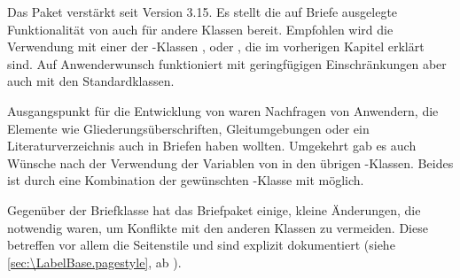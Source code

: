 \iffalse%
Die Klasse \Class{scrlttr2}\important{\Class{scrlttr2}} wurde 2002 von Grund
auf neu entwickelt. Sie hat daher auch ein komplett anderes Bedienkonzept als
alle übrigen mir bekannten Klassen. Die neue Art der Bedienung ist
möglicherweise etwas ungewohnt, bietet jedoch nicht nur dem geübten Anwender
einige Vorteile.%
\fi%

Das Paket %
 verstärkt \KOMAScript{} seit Version
3.15. Es stellt die auf Briefe ausgelegte Funktionalität von 
auch für andere Klassen bereit. Empfohlen wird die Verwendung mit einer der
\KOMAScript-Klassen ,  oder ,
die im vorherigen Kapitel erklärt sind. %
\iffalse %
Mit geringfügigen Einschränkungen funktioniert \Package{scrletter}%
\else %
Auf Anwenderwunsch funktioniert  mit geringfügigen
Einschränkungen %
\fi %
aber auch mit den Standardklassen.

Ausgangspunkt für die Entwicklung von  waren
Nachfragen von Anwendern, die Elemente wie
Gliederungsüberschriften, Gleitumgebungen oder ein Literaturverzeichnis auch in Briefen
haben wollten. Umgekehrt gab es auch Wünsche nach der Verwendung der Variablen
von  in den übrigen \KOMAScript-Klassen. Beides ist durch eine
Kombination der gewünschten \KOMAScript-Klasse mit 
möglich.

Gegenüber der Briefklasse hat das Briefpaket einige, kleine Änderungen, die
notwendig waren, um Konflikte mit den anderen Klassen zu vermeiden. Diese
betreffen vor allem die Seitenstile und sind explizit dokumentiert (siehe
\autoref{sec:\LabelBase.pagestyle}, ab
). %
\iffalse %
Wo \Package{scrletter} nicht explizit erwähnt ist, gilt dafür alles, was für
\Class{scrlttr2} dokumentiert ist, ohne Änderung. %
\fi%



